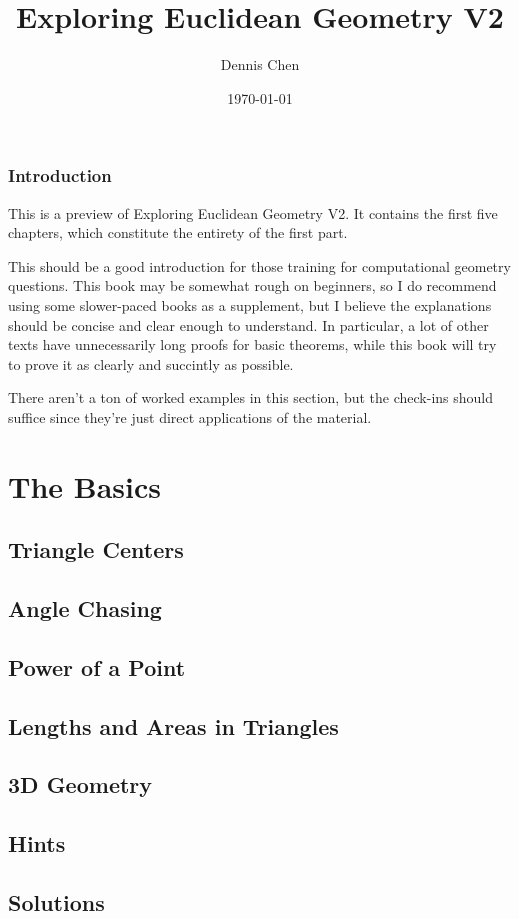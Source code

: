 \documentclass[oneside]{book}
\title{Exploring Euclidean Geometry V2}
\author{Dennis Chen}
\date{\today}
\begin{document}


\maketitle

\section*{Introduction}
This is a preview of Exploring Euclidean Geometry V2. It contains the first five chapters, which constitute the entirety of the first part.

This should be a good introduction for those training for computational geometry questions. This book may be somewhat rough on beginners, so I do recommend using some slower-paced books as a supplement, but I believe the explanations should be concise and clear enough to understand. In particular, a lot of other texts have unnecessarily long proofs for basic theorems, while this book will try to prove it as clearly and succintly as possible.

There aren't a ton of worked examples in this section, but the check-ins should suffice since they're just direct applications of the material.

\pagebreak

\toc

\part{The Basics}

\chapter{Triangle Centers}



\chapter{Angle Chasing}



\chapter{Power of a Point}



\chapter{Lengths and Areas in Triangles}



\chapter{3D Geometry}



\chapter{Hints}



\chapter{Solutions}


\end{document}
